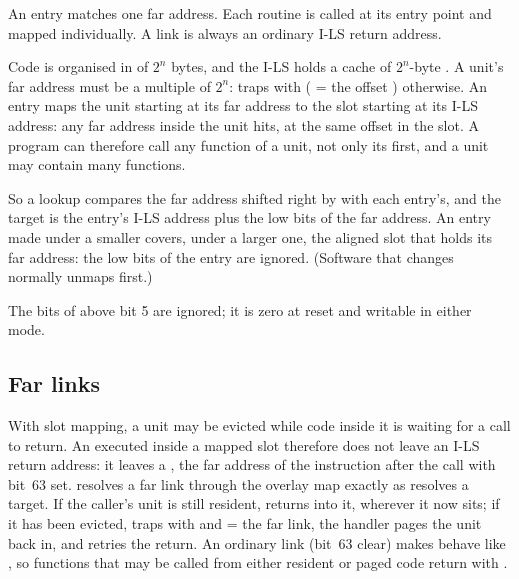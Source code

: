 \begin{description}[leftmargin=1em,style=nextline]
\item[\csr{xslot} = 0 (exact mapping)] An entry matches one far address. Each routine is called at its
  entry point and mapped individually. A link is always an ordinary I-LS return address.
\item[\csr{xslot} = $n > 0$ (slot mapping)] Code is organised in  of $2^n$ bytes, and the
  I-LS holds a cache of $2^n$-byte . A unit's far address must be a multiple of $2^n$:
   traps with  ( = the offset ) otherwise. An entry maps the
  unit starting at its far address to the slot starting at its I-LS address: any far address inside
  the unit hits, at the same offset in the slot. A program can therefore call any function of a unit,
  not only its first, and a unit may contain many functions.
\end{description}

So a lookup compares the far address shifted right by  with each entry's, and the target is
the entry's I-LS address plus the low  bits of the far address. An entry made under a
smaller  covers, under a larger one, the aligned slot that holds its far address: the low
bits of the entry are ignored. (Software that changes  normally unmaps first.)

The bits of  above bit 5 are ignored; it is zero at reset and writable in either mode.

\subsection{Far links}

With slot mapping, a unit may be evicted while code inside it is waiting for a call to return. An
 executed inside a mapped slot therefore does not leave an I-LS return address: it leaves
a , the far address of the instruction after the call with bit~63 set. 
resolves a far link through the overlay map exactly as  resolves a target. If the caller's
unit is still resident,  returns into it, wherever it now sits; if it has been evicted,
 traps with  and  = the far link, the handler pages the unit back
in, and  retries the return. An ordinary link (bit~63 clear) makes  behave like
, so functions that may be called from either resident or paged code return with
.

